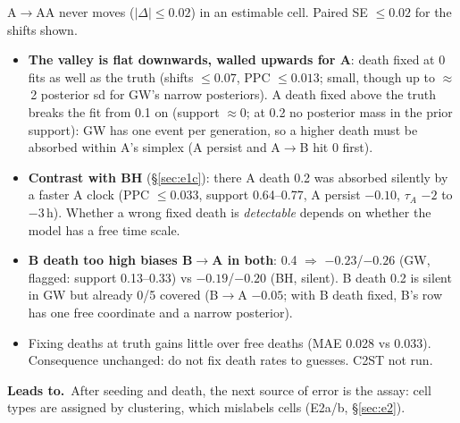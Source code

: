 \documentclass[10pt,a4paper]{article}
\newcommand{\tA}{$\tau_A$}
\newcommand{\blk}[1]{\par\needspace{5\baselineskip}\smallskip{\sffamily\bfseries\color{inkgray}#1}\par}
\newcommand{\Comment}{\blk{Comment}}
\newcommand{\Leads}[1]{\begin{leadbox}{\sffamily\bfseries\color{caqua!70!black}Leads to.}\ #1\end{leadbox}}
\renewcommand{\blk}[1]{\par\Needspace*{5\baselineskip}\smallskip{\sffamily\bfseries\color{inkgray}#1}\par}
\newcommand{\sref}[1]{\S\ref{#1}}
\begin{document}
A$\to$AA never moves ($|\Delta| \le 0.02$) in an estimable cell. Paired SE $\le 0.02$ for the shifts shown.
\Comment
\begin{itemize}
\item \textbf{The valley is flat downwards, walled upwards for A}: death fixed at 0 fits as well as the truth (shifts $\le 0.07$, PPC $\le 0.013$; small, though up to $\approx$\,2 posterior sd for GW's narrow posteriors). A death fixed above the truth breaks the fit from 0.1 on (support $\approx 0$; at 0.2 no posterior mass in the prior support): GW has one event per generation, so a higher death must be absorbed within A's simplex (A persist and A$\to$B hit 0 first).
\item \textbf{Contrast with BH} (\S\ref{sec:e1c}): there A death 0.2 was absorbed silently by a faster A clock (PPC $\le 0.033$, support 0.64--0.77, A persist $-0.10$, \tA{} $-2$ to $-3$\,h). Whether a wrong fixed death is \emph{detectable} depends on whether the model has a free time scale.
\item \textbf{B death too high biases B$\to$A in both}: 0.4 $\Rightarrow$ $-0.23$/$-0.26$ (GW, flagged: support 0.13--0.33) vs $-0.19$/$-0.20$ (BH, silent). B death 0.2 is silent in GW but already 0/5 covered (B$\to$A $-0.05$; with B death fixed, B's row has one free coordinate and a narrow posterior).
\item Fixing deaths at truth gains little over free deaths (MAE 0.028 vs 0.033). Consequence unchanged: do not fix death rates to guesses. C2ST not run.
\end{itemize}
\Leads{After seeding and death, the next source of error is the assay: cell types are assigned by clustering, which mislabels cells (E2a/b, \sref{sec:e2}).}
\end{document}
